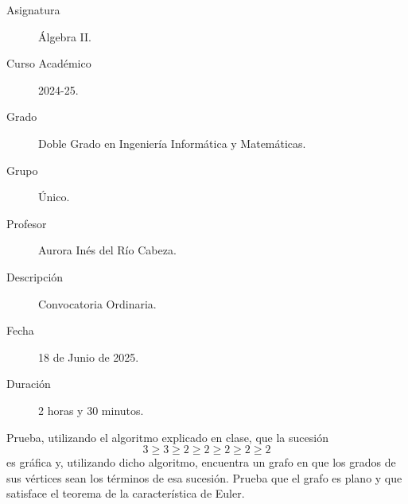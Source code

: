 \documentclass[12pt]{article}
\begin{document}

    
    

    \begin{description}
        \item[Asignatura] Álgebra II.
        \item[Curso Académico] 2024-25.
        \item[Grado] Doble Grado en Ingeniería Informática y Matemáticas.
        \item[Grupo] Único.
        \item[Profesor] Aurora Inés del Río Cabeza.
        \item[Descripción] Convocatoria Ordinaria.
        \item[Fecha] 18 de Junio de 2025.
        \item[Duración] 2 horas y 30 minutos.
    
    \end{description}
    \newpage


    
    \begin{ejercicio}[1 punto]
        Prueba, utilizando el algoritmo explicado en clase, que la sucesión
        $$3 \ge 3 \ge 2 \ge 2 \ge 2 \ge 2 \ge 2$$
        es gráfica y, utilizando dicho algoritmo, encuentra un grafo en que los grados de sus vértices sean los términos de esa sucesión. Prueba que el grafo es plano y que satisface el teorema de la característica de Euler.
    \end{ejercicio}
\end{document}
